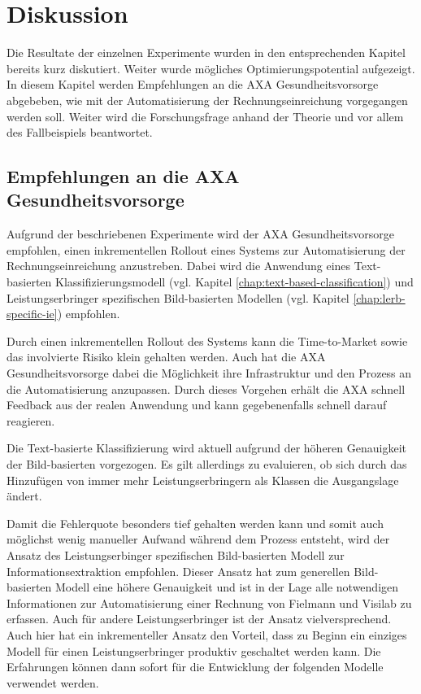 \section{Diskussion}
\label{chap:summary}

Die Resultate der einzelnen Experimente wurden in den entsprechenden Kapitel bereits kurz diskutiert. Weiter wurde mögliches Optimierungspotential aufgezeigt. In diesem Kapitel werden Empfehlungen an die AXA Gesundheitsvorsorge abgebeben, wie mit der Automatisierung der Rechnungseinreichung vorgegangen werden soll. Weiter wird die Forschungsfrage anhand der Theorie und vor allem des Fallbeispiels beantwortet.

\subsection{Empfehlungen an die AXA Gesundheitsvorsorge}


Aufgrund der beschriebenen Experimente wird der AXA Gesundheitsvorsorge empfohlen, einen inkrementellen Rollout eines Systems zur Automatisierung der Rechnungseinreichung anzustreben. Dabei wird die Anwendung eines Text-basierten Klassifizierungsmodell (vgl. Kapitel \ref{chap:text-based-classification}) und Leistungserbringer spezifischen Bild-basierten Modellen (vgl. Kapitel \ref{chap:lerb-specific-ie}) empfohlen.

Durch einen inkrementellen Rollout des Systems kann die Time-to-Market sowie das involvierte Risiko klein gehalten werden. Auch hat die AXA Gesundheitsvorsorge dabei die Möglichkeit ihre Infrastruktur und den Prozess an die Automatisierung anzupassen. Durch dieses Vorgehen erhält die AXA schnell Feedback aus der realen Anwendung und kann gegebenenfalls schnell darauf reagieren.

Die Text-basierte Klassifizierung wird aktuell aufgrund der höheren Genauigkeit der Bild-basierten vorgezogen. Es gilt allerdings zu evaluieren, ob sich durch das Hinzufügen von immer mehr Leistungserbringern als Klassen die Ausgangslage ändert.

Damit die Fehlerquote besonders tief gehalten werden kann und somit auch möglichst wenig manueller Aufwand während dem Prozess entsteht, wird der Ansatz des Leistungserbinger spezifischen Bild-basierten Modell zur Informationsextraktion empfohlen. Dieser Ansatz hat zum generellen Bild-basierten Modell eine höhere Genauigkeit und ist in der Lage alle notwendigen Informationen zur Automatisierung einer Rechnung von Fielmann und Visilab zu erfassen. Auch für andere Leistungserbringer ist der Ansatz vielversprechend. Auch hier hat ein inkrementeller Ansatz den Vorteil, dass zu Beginn ein einziges Modell für einen Leistungserbringer produktiv geschaltet werden kann. Die Erfahrungen können dann sofort für die Entwicklung der folgenden Modelle verwendet werden.

